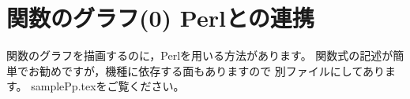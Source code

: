 \documentclass[a4j]{jarticle}
\begin{document}
















\section{関数のグラフ(0) \textsf{Perl}との連携}
関数のグラフを描画するのに，\textsf{Perl}を用いる方法があります。
関数式の記述が簡単でお勧めですが，機種に依存する面もありますので
別ファイルにしてあります。
\textsf{samplePp.tex}をご覧ください。


\end{document}
